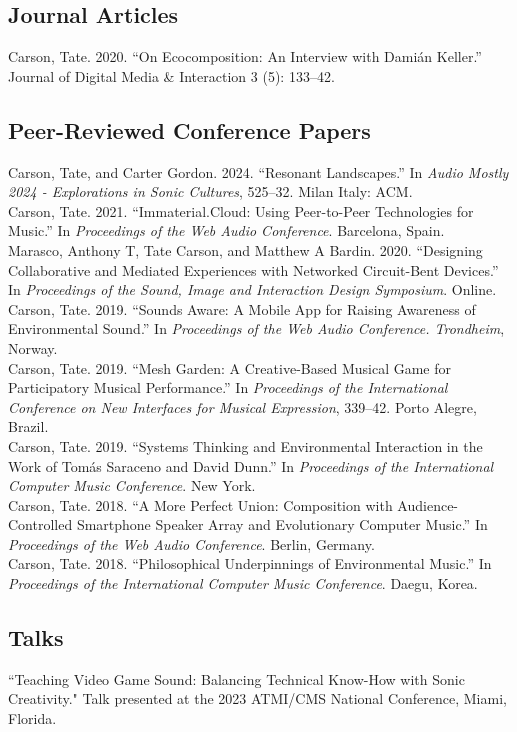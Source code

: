 \documentclass[12pt, a4paper]{article}
\newcommand{\years}[1]{\marginnote{\scriptsize #1}}
\begin{document}
\subsection*{Journal Articles}
\noindent
\years{2020}Carson, Tate. 2020. “On Ecocomposition: An Interview with Damián Keller.” Journal of Digital Media \& Interaction 3 (5): 133–42.\\


\subsection*{Peer-Reviewed Conference Papers}
\years{2024} Carson, Tate, and Carter Gordon. 2024. “Resonant Landscapes.” In \textit{Audio Mostly 2024 - Explorations in Sonic Cultures}, 525–32. Milan Italy: ACM.\\
\years{2021} Carson, Tate. 2021. “Immaterial.Cloud: Using Peer-to-Peer Technologies for Music.” In \textit{Proceedings of the Web Audio Conference}. Barcelona, Spain. \\ 
\years{2020} Marasco, Anthony T, Tate Carson, and Matthew A Bardin. 2020. “Designing Collaborative and Mediated Experiences with Networked Circuit-Bent Devices.” In \textit{Proceedings of the Sound, Image and Interaction Design Symposium}. Online.\\
\years{2019} Carson, Tate. 2019. “Sounds Aware: A Mobile App for Raising Awareness of Environmental Sound.” In \textit{Proceedings of the Web Audio Conference. Trondheim}, Norway.\\
Carson, Tate. 2019. “Mesh Garden: A Creative-Based Musical Game for Participatory Musical Performance.” In \textit{Proceedings of the International Conference on New Interfaces for Musical Expression}, 339–42. Porto Alegre, Brazil.\\
Carson, Tate. 2019. “Systems Thinking and Environmental Interaction in the Work of Tomás Saraceno and David Dunn.” In \textit{Proceedings of the International Computer Music Conference}. New York.
\\
\years{2018} Carson, Tate. 2018. “A More Perfect Union: Composition with Audience-Controlled Smartphone Speaker Array and Evolutionary Computer Music.” In \textit{Proceedings of the Web Audio Conference}. Berlin, Germany.\\
Carson, Tate. 2018. “Philosophical Underpinnings of Environmental Music.” In \textit{Proceedings of the International Computer Music Conference}. Daegu, Korea.



\subsection*{Talks}
\years{2023} ``Teaching Video Game Sound: Balancing Technical Know-How with Sonic Creativity." Talk presented at the 2023 ATMI/CMS National Conference, Miami, Florida.
\end{document}
